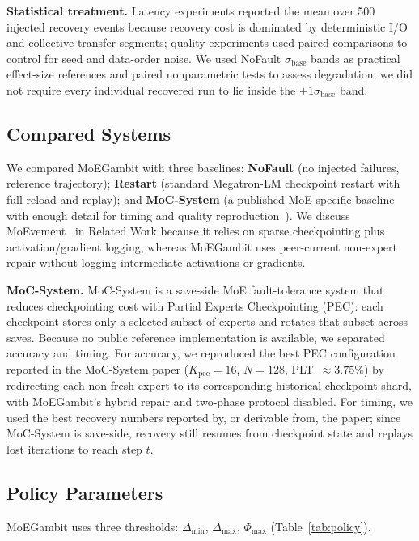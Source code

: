 \documentclass[10pt,conference]{IEEEtran}
\begin{document}
\textbf{Statistical treatment.} Latency experiments reported the mean over 500 injected recovery events because recovery cost is dominated by deterministic I/O and collective-transfer segments; quality experiments used paired comparisons to control for seed and data-order noise. We used NoFault $\sigma_{\text{base}}$ bands as practical effect-size references and paired nonparametric tests to assess degradation; we did not require every individual recovered run to lie inside the $\pm1\sigma_{\text{base}}$ band.

\subsection{Compared Systems}\label{sec:compared}

We compared MoEGambit with three baselines: \textbf{NoFault} (no injected failures, reference trajectory); \textbf{Restart} (standard Megatron-LM checkpoint restart with full reload and replay); and \textbf{MoC-System} (a published MoE-specific baseline with enough detail for timing and quality reproduction~\cite{cai2024moc}). We discuss MoEvement~\cite{gandhi2026moevement} in Related Work because it relies on sparse checkpointing plus activation/gradient logging, whereas MoEGambit uses peer-current non-expert repair without logging intermediate activations or gradients.

\textbf{MoC-System.} MoC-System is a save-side MoE fault-tolerance system that reduces checkpointing cost with Partial Experts Checkpointing (PEC): each checkpoint stores only a selected subset of experts and rotates that subset across saves. Because no public reference implementation is available, we separated accuracy and timing. For accuracy, we reproduced the best PEC configuration reported in the MoC-System paper ($K_{\text{pec}}=16$, $N=128$, PLT~$\approx 3.75\%$) by redirecting each non-fresh expert to its corresponding historical checkpoint shard, with MoEGambit's hybrid repair and two-phase protocol disabled. For timing, we used the best recovery numbers reported by, or derivable from, the paper; since MoC-System is save-side, recovery still resumes from checkpoint state and replays lost iterations to reach step $t$.

\subsection{Policy Parameters}

MoEGambit uses three thresholds: $\Delta_{\min}$, $\Delta_{\max}$, $\Phi_{\max}$ (Table~\ref{tab:policy}).
\end{document}
